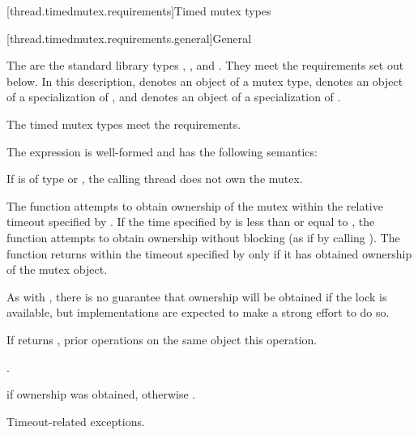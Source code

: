 [thread.timedmutex.requirements]{Timed mutex types}

[thread.timedmutex.requirements.general]{General}

\pnum
The  are the standard library types ,
, and . They
meet the requirements set out below.
In this description,  denotes an object of a mutex type,
 denotes an object of a
specialization of , and  denotes an
object of a
specialization of .
\begin{note}
The timed mutex types meet the 
requirements.
\end{note}

\pnum
The expression  is well-formed
and has the following semantics:

\begin{itemdescr}
\pnum
\expects
If  is of type  or
, the calling thread does not
own the mutex.

\pnum
\effects
The function attempts to obtain ownership of the mutex within the
relative timeout
specified by . If the time specified by  is less than or
equal to , the function attempts to obtain ownership without blocking (as if by calling
). The function returns within the timeout specified by
 only if it has obtained ownership of the mutex object.
\begin{note}
As
with , there is no guarantee that ownership will be obtained if the
lock is available, but implementations are expected to make a strong effort to do so.
\end{note}

\pnum
\sync
If  returns , prior  operations
on the same object  this operation.

\pnum
\returntype {}.

\pnum
\returns
{} if ownership was obtained, otherwise .

\pnum
\throws
Timeout-related exceptions.
\end{itemdescr}

